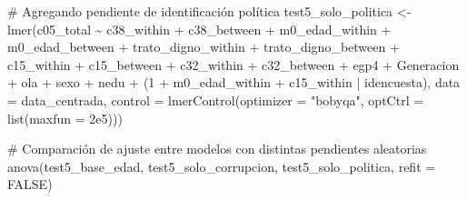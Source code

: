 \documentclass[
  spanish,
  a4paper,
  oneside]{scrbook}
\newenvironment{Shaded}{\begin{snugshade}}{\end{snugshade}}
\newcommand{\AttributeTok}[1]{\textcolor[rgb]{0.40,0.45,0.13}{#1}}
\newcommand{\CommentTok}[1]{\textcolor[rgb]{0.37,0.37,0.37}{#1}}
\newcommand{\ConstantTok}[1]{\textcolor[rgb]{0.56,0.35,0.01}{#1}}
\newcommand{\DecValTok}[1]{\textcolor[rgb]{0.68,0.00,0.00}{#1}}
\newcommand{\FloatTok}[1]{\textcolor[rgb]{0.68,0.00,0.00}{#1}}
\newcommand{\FunctionTok}[1]{\textcolor[rgb]{0.28,0.35,0.67}{#1}}
\newcommand{\NormalTok}[1]{\textcolor[rgb]{0.00,0.23,0.31}{#1}}
\newcommand{\OtherTok}[1]{\textcolor[rgb]{0.00,0.23,0.31}{#1}}
\newcommand{\SpecialCharTok}[1]{\textcolor[rgb]{0.37,0.37,0.37}{#1}}
\newcommand{\StringTok}[1]{\textcolor[rgb]{0.13,0.47,0.30}{#1}}
\begin{document}
\begin{Shaded}
\begin{Highlighting}[]
\CommentTok{\# Agregando pendiente de identificación política}
\NormalTok{test5\_solo\_politica }\OtherTok{\textless{}{-}} \FunctionTok{lmer}\NormalTok{(c05\_total }\SpecialCharTok{\textasciitilde{}} 
\NormalTok{                              c38\_within }\SpecialCharTok{+}\NormalTok{ c38\_between }\SpecialCharTok{+}
\NormalTok{                              m0\_edad\_within }\SpecialCharTok{+}\NormalTok{ m0\_edad\_between }\SpecialCharTok{+}
\NormalTok{                              trato\_digno\_within }\SpecialCharTok{+}\NormalTok{ trato\_digno\_between }\SpecialCharTok{+}
\NormalTok{                              c15\_within }\SpecialCharTok{+}\NormalTok{ c15\_between }\SpecialCharTok{+}
\NormalTok{                              c32\_within }\SpecialCharTok{+}\NormalTok{ c32\_between }\SpecialCharTok{+}
\NormalTok{                              egp4 }\SpecialCharTok{+}\NormalTok{ Generacion }\SpecialCharTok{+}\NormalTok{ ola }\SpecialCharTok{+}\NormalTok{ sexo }\SpecialCharTok{+}\NormalTok{ nedu }\SpecialCharTok{+}
\NormalTok{                              (}\DecValTok{1} \SpecialCharTok{+}\NormalTok{ m0\_edad\_within }\SpecialCharTok{+}\NormalTok{ c15\_within }\SpecialCharTok{|}\NormalTok{ idencuesta),}
                            \AttributeTok{data =}\NormalTok{ data\_centrada,}
                            \AttributeTok{control =} \FunctionTok{lmerControl}\NormalTok{(}\AttributeTok{optimizer =} \StringTok{"bobyqa"}\NormalTok{,}
                                                  \AttributeTok{optCtrl =} \FunctionTok{list}\NormalTok{(}\AttributeTok{maxfun =} \FloatTok{2e5}\NormalTok{)))}

\CommentTok{\# Comparación de ajuste entre modelos con distintas pendientes aleatorias}
\FunctionTok{anova}\NormalTok{(test5\_base\_edad, test5\_solo\_corrupcion, test5\_solo\_politica, }\AttributeTok{refit =} \ConstantTok{FALSE}\NormalTok{)}
\end{Highlighting}
\end{Shaded}
\end{document}
